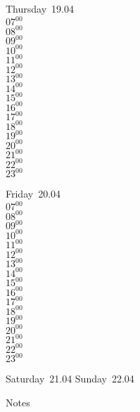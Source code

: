 \documentclass[11pt, a4paper]{book}\usepackage[]{graphicx}\usepackage[]{color}
\begin{document}
\begin{weekdaybox}
  Thursday~19.04\\
  { 
  \vfill
  $07^{00}$\\
$08^{00}$\\
$09^{00}$\\
$10^{00}$\\
$11^{00}$\\
$12^{00}$\\
$13^{00}$\\
$14^{00}$\\
$15^{00}$\\
$16^{00}$\\
$17^{00}$\\
$18^{00}$\\
$19^{00}$\\
$20^{00}$\\
$21^{00}$\\
$22^{00}$\\
$23^{00}$\\
  }
\end{weekdaybox} 
\begin{weekdaybox}
  Friday~20.04\\
  { 
  \vfill
  $07^{00}$\\
$08^{00}$\\
$09^{00}$\\
$10^{00}$\\
$11^{00}$\\
$12^{00}$\\
$13^{00}$\\
$14^{00}$\\
$15^{00}$\\
$16^{00}$\\
$17^{00}$\\
$18^{00}$\\
$19^{00}$\\
$20^{00}$\\
$21^{00}$\\
$22^{00}$\\
$23^{00}$\\
  }
\end{weekdaybox}
\begin{weekendbox}
  Saturday~21.04
  \tcblower
  Sunday~22.04
\end{weekendbox} %
\begin{notebox}
  Notes
\end{notebox}
\clearpage
\end{document}
